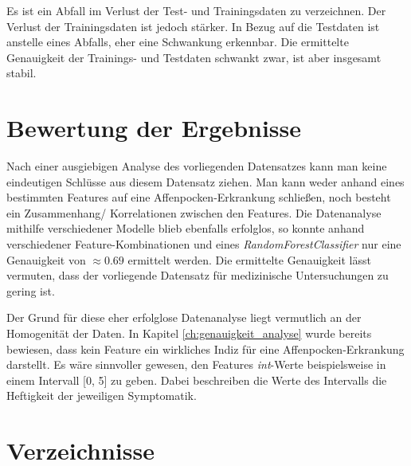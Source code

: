 \documentclass[13pt,a4paper, listof=entryprefix, bibliography=totocnumbered,toc=listofnumbered,lof=listofnumbered]{scrartcl}
\newcounter{verzeichnis}
\begin{document}
Es ist ein Abfall im Verlust der Test- und Trainingsdaten zu verzeichnen. Der Verlust der Trainingsdaten ist jedoch stärker. 
In Bezug auf die Testdaten ist anstelle eines Abfalls, eher eine Schwankung erkennbar. Die ermittelte Genauigkeit der Trainings- und Testdaten 
schwankt zwar, ist aber insgesamt stabil. 


	\section{Bewertung der Ergebnisse}
		\label{ch:bewertungs_ergebnisse}

Nach einer ausgiebigen Analyse des vorliegenden Datensatzes kann man keine eindeutigen Schlüsse aus diesem Datensatz ziehen.
Man kann weder anhand eines bestimmten Features auf eine Affenpocken-Erkrankung schließen, noch besteht ein Zusammenhang/ Korrelationen
zwischen den Features. Die Datenanalyse mithilfe verschiedener Modelle blieb ebenfalls erfolglos, so konnte anhand verschiedener 
Feature-Kombinationen und eines \textit{RandomForestClassifier} nur eine Genauigkeit von $\approx 0.69$ ermittelt werden. Die
ermittelte Genauigkeit lässt vermuten, dass der vorliegende Datensatz für medizinische Untersuchungen zu gering ist. 

Der Grund für diese eher erfolglose Datenanalyse liegt vermutlich an der Homogenität der Daten. 
In Kapitel \ref{ch:genauigkeit_analyse} wurde bereits bewiesen, dass kein Feature ein wirkliches Indiz für eine 
Affenpocken-Erkrankung darstellt. Es wäre sinnvoller gewesen, den Features \textit{int}-Werte beispielsweise in einem Intervall [0, 5] 
zu geben. Dabei beschreiben die Werte des Intervalls die Heftigkeit der jeweiligen Symptomatik.


		\pagebreak

		 \label{Verzeichnisse}
		\renewcommand{\thesection}{\Roman{verzeichnis}}
		\section*{Verzeichnisse} 

		\listoffigures
		\pagebreak

		\listoftables
		\pagebreak

\vspace{-3em}


    
\pagebreak

	
\end{document}
